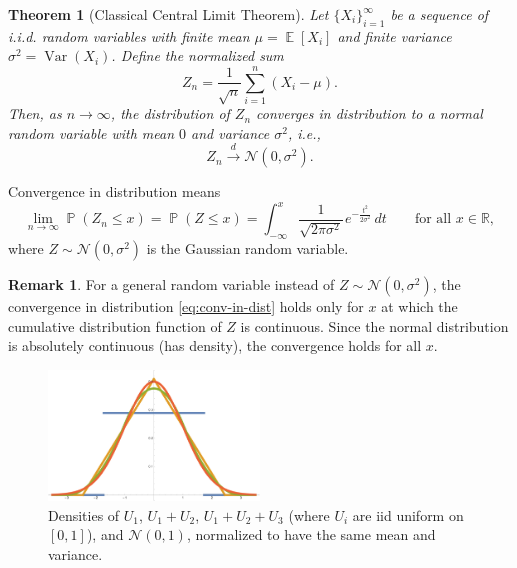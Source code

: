 \documentclass[letterpaper,11pt,oneside,reqno]{article}
\numberwithin{equation}{section}
\newcommand{\ssp}{\hspace{1pt}}
\newtheorem{theorem}[proposition]{Theorem}
\theoremstyle{definition}
\newtheorem{remark}[proposition]{Remark}
\begin{document}
\begin{theorem}[Classical Central Limit Theorem]
	Let $\{X_i\}_{i=1}^{\infty}$ be a sequence of i.i.d. random variables with finite mean $\mu = \operatorname{\mathbb{E}}[X_i]$ and finite 
	variance $\sigma^2 = \operatorname{\mathrm{Var}}(X_i)$. 
	Define the normalized sum
\[
Z_n = \frac{1}{\sqrt{n}} \sum_{i=1}^n \left(X_i - \mu\right).
\]
Then, as $n \to \infty$, the distribution of $Z_n$ converges in distribution to a normal random variable with mean $0$ and variance $\sigma^2$, i.e.,
\[
Z_n \xrightarrow{d} \mathcal{N}(0, \sigma^2).
\]
\end{theorem}
Convergence in distribution means 
\begin{equation}
	\label{eq:conv-in-dist}
	\lim_{n \to \infty} \operatorname{\mathbb{P}}(Z_n \leq x) = \operatorname{\mathbb{P}}(Z \leq x)
		= \int_{-\infty}^x \frac{1}{\sqrt{2\pi \sigma^2}}\ssp e^{-\frac{t^2}{2\sigma^2}} \, dt
	\qquad 
	\text{for all } x \in \mathbb{R},
\end{equation}
where $Z \sim \mathcal{N}(0, \sigma^2)$ is the Gaussian random variable.

\begin{remark}
	For a general random variable instead of
	$Z\sim \mathcal{N}(0, \sigma^2)$, the convergence in distribution
	\eqref{eq:conv-in-dist} holds only for $x$ at which the cumulative distribution function of $Z$ is continuous.
	Since the normal distribution is absolutely continuous (has density), the convergence holds for all $x$.
\end{remark}
\begin{figure}[htpb]
	\centering
	\includegraphics[width=0.5\textwidth]{./pictures/uniform_pdfs.pdf}
	\caption{Densities of $U_1$, $U_1+U_2$, $U_1+U_2+U_3$ (where $U_i$ are iid uniform on $[0,1]$), 
		and $\mathcal{N}(0,1)$, 
		normalized to have the same mean and variance.}
	\label{fig:uniform_pdfs}
\end{figure}
\end{document}
